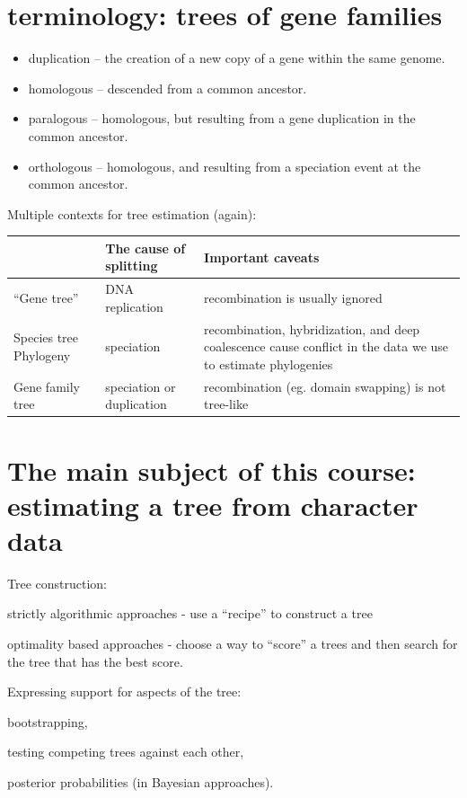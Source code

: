 \documentclass[landscape]{foils}
\begin{document}
\myNewSlide
\section*{terminology: trees of gene families}
\begin{itemize}
	\item duplication -- the creation of a new copy of a gene within the same genome.
	\item homologous -- descended from a common ancestor.
	\item paralogous --  homologous, but resulting from a gene duplication in the common ancestor. 
	\item orthologous -- homologous, and resulting from a speciation event at the common ancestor.
\end{itemize}


\myNewSlide
Multiple contexts for tree estimation (again):
\begin{table}[htdp]
\begin{center}
\begin{tabular}{|p{5cm}|p{5cm}|p{11cm}|}
& {\bf The cause of splitting} & {\bf Important caveats} \\
\hline
``Gene tree'' & DNA replication & recombination is usually ignored \\
\hline
Species tree Phylogeny & speciation & recombination, hybridization, and deep coalescence cause conflict in the data we use to estimate phylogenies\\
\hline
Gene family tree & speciation or duplication & recombination (eg. domain swapping) is not tree-like \\
\hline
\end{tabular}
\end{center}
\label{default}
\end{table}%



\myNewSlide
\section*{The main subject of this course: estimating a tree from character data}
Tree construction:
\begin{compactitem}
	\item strictly algorithmic approaches - use a ``recipe'' to construct a tree
	\item optimality based approaches - choose a way to ``score'' a trees and then search for the tree that has the best score.
\end{compactitem}
Expressing support for aspects of the tree:
\begin{compactitem}
	\item bootstrapping,
	\item testing competing trees against each other,
	\item posterior probabilities (in Bayesian approaches).
\end{compactitem}
\end{document}

